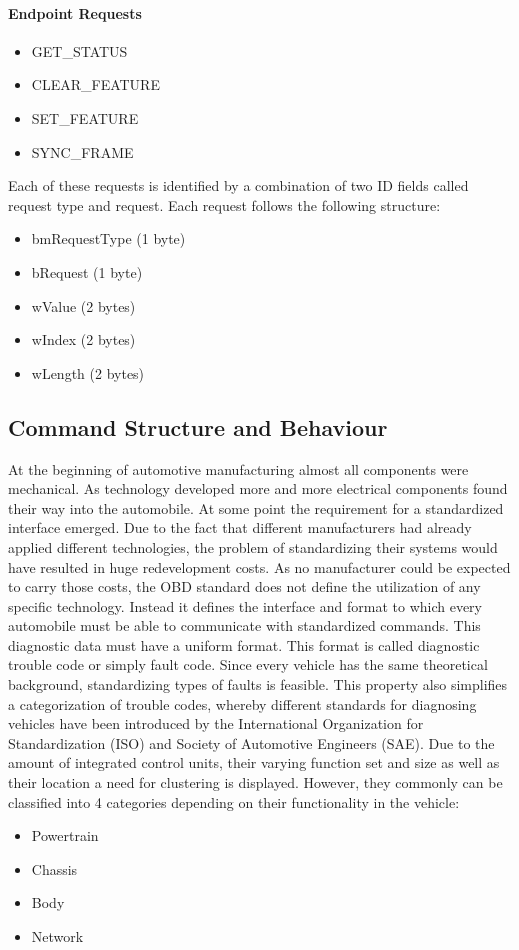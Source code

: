 \paragraph{Endpoint Requests}
\begin{itemize}
 \item GET\_STATUS
 \item CLEAR\_FEATURE
 \item SET\_FEATURE
 \item SYNC\_FRAME
\end{itemize}

Each of these requests is identified by a combination of two ID fields called request type and request. Each request follows the 
following structure:
\begin{itemize}
 \item bmRequestType (1 byte)
 \item bRequest (1 byte)
 \item wValue (2 bytes)
 \item wIndex (2 bytes)
 \item wLength (2 bytes)
\end{itemize}

\subsection{Command Structure and Behaviour}
At the beginning of automotive manufacturing almost all components were mechanical. As technology developed more and more electrical 
components found their way into the automobile. At some point the requirement for a standardized interface emerged. Due to the fact 
that different manufacturers had already applied different technologies, the problem of standardizing their systems would have 
resulted in huge redevelopment costs. As no manufacturer could be expected to carry those costs, the OBD standard does not define the 
utilization of any specific technology. Instead it defines the interface and format to which every automobile must be able to 
communicate with standardized commands. 
This diagnostic data must have a uniform format. This format is called diagnostic trouble code or simply fault code. Since every 
vehicle has the same theoretical background, standardizing types of faults is feasible. This property also simplifies a categorization 
of trouble codes, whereby different standards for diagnosing vehicles have been introduced by the International Organization for 
Standardization (ISO) and Society of Automotive Engineers (SAE). 
Due to the amount of integrated control units, their varying function set and size as well as their location a need for clustering is 
displayed. However, they commonly can be classified into 4 categories depending on their functionality in the vehicle:
\begin{itemize}
 \item Powertrain 
 \item Chassis 
 \item Body 
 \item Network
\end{itemize}

